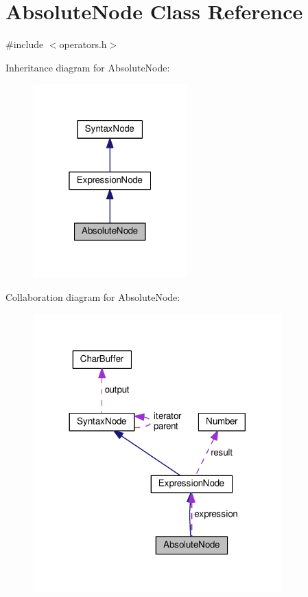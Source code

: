 \hypertarget{classAbsoluteNode}{}\section{Absolute\+Node Class Reference}
\label{classAbsoluteNode}


{\ttfamily \#include $<$operators.\+h$>$}



Inheritance diagram for Absolute\+Node\+:
\nopagebreak
\begin{figure}[H]
\begin{center}
\leavevmode
\includegraphics[width=169pt]{d4/df2/classAbsoluteNode__inherit__graph}
\end{center}
\end{figure}


Collaboration diagram for Absolute\+Node\+:
\nopagebreak
\begin{figure}[H]
\begin{center}
\leavevmode
\includegraphics[width=272pt]{db/d74/classAbsoluteNode__coll__graph}
\end{center}
\end{figure}
